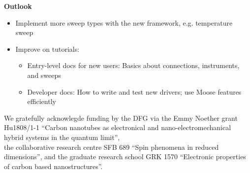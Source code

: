 \documentclass[portrait]{a0poster}
\newcommand{\lightblue}{\color{lightblue}}
\newcommand{\heading}[1]{
  {\color{heading}\boldmath\textbf{\huge #1}}\\[\medskipamount]
}
\begin{document}
{\begin{minipage}[t][\columnheighta-2\fboxsep-2\fboxrule][t]
\begin{minipage}{\textwidth}
\vspace*{2cm}
\heading{Outlook}
\vspace*{-2cm}

\begin{itemize}
\item Implement more sweep types with the new framework, e.g. temperature sweep
\item {\lightblue Improve on tutorials:}
  \begin{itemize}
  \item Entry-level docs for new users: Basics about connections, instruments,
    and sweeps
  \item Developer docs: How to write and test new drivers; use Moose features
    efficiently
  \end{itemize}
  
\end{itemize}


\end{minipage}

\end{minipage}}  %
%
%
%

\vspace*{0.5cm}
\begin{center}\color{invheading}\large
\hspace*{-4cm}We gratefully acknowlegde funding by the DFG via the Emmy Noether grant
Hu1808/1-1 ``Carbon nanotubes as electronical and nano-electromechanical hybrid systems in
the quantum limit'',
\\ \hspace*{-4cm}
the collaborative research centre SFB 689 ``Spin phenomena in reduced dimensions'', and
the graduate research school GRK 1570  ``Electronic properties of
carbon based nanostructures''.
\end{center}
\end{document}

